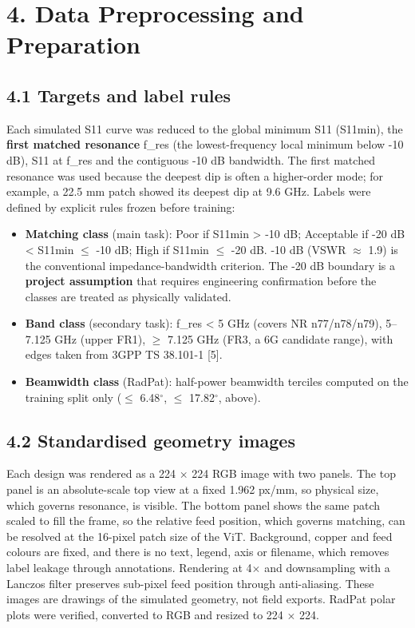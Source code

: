 \documentclass[11pt,a4paper]{article}
\begin{document}
\section*{4. Data Preprocessing and Preparation}
\subsection*{4.1 Targets and label rules}
Each simulated S11 curve was reduced to the global minimum S11 (S11min), the \textbf{first matched resonance} f\_res (the lowest-frequency local minimum below -10 dB), S11 at f\_res and the contiguous -10 dB bandwidth. The first matched resonance was used because the deepest dip is often a higher-order mode; for example, a 22.5 mm patch showed its deepest dip at 9.6 GHz. Labels were defined by explicit rules frozen before training:

\begin{itemize}[leftmargin=*,itemsep=1pt]
\item \textbf{Matching class} (main task): Poor if S11min > -10 dB; Acceptable if -20 dB < S11min $\leq$ -10 dB; High if S11min $\leq$ -20 dB. -10 dB (VSWR $\approx$ 1.9) is the conventional impedance-bandwidth criterion. The -20 dB boundary is a \textbf{project assumption} that requires engineering confirmation before the classes are treated as physically validated.
\item \textbf{Band class} (secondary task): f\_res < 5 GHz (covers NR n77/n78/n79), 5--7.125 GHz (upper FR1), $\geq$ 7.125 GHz (FR3, a 6G candidate range), with edges taken from 3GPP TS 38.101-1 [5].
\item \textbf{Beamwidth class} (RadPat): half-power beamwidth terciles computed on the training split only ($\leq$ 6.48$^\circ$, $\leq$ 17.82$^\circ$, above).
\end{itemize}
\subsection*{4.2 Standardised geometry images}
Each design was rendered as a 224 $\times$ 224 RGB image with two panels. The top panel is an absolute-scale top view at a fixed 1.962 px/mm, so physical size, which governs resonance, is visible. The bottom panel shows the same patch scaled to fill the frame, so the relative feed position, which governs matching, can be resolved at the 16-pixel patch size of the ViT. Background, copper and feed colours are fixed, and there is no text, legend, axis or filename, which removes label leakage through annotations. Rendering at 4$\times$ and downsampling with a Lanczos filter preserves sub-pixel feed position through anti-aliasing. These images are drawings of the simulated geometry, not field exports. RadPat polar plots were verified, converted to RGB and resized to 224 $\times$ 224.
\end{document}
